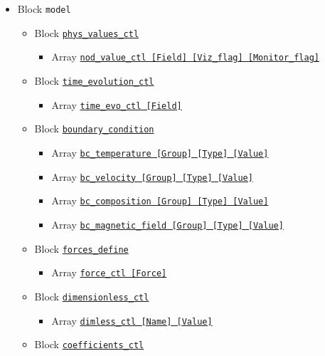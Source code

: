 \begin{itemize}
%
\item Block \verb|model|
	\begin{itemize}
	\item Block \hyperref[href_t:phys_values_ctl]{\tt phys\_values\_ctl}
		\begin{itemize} \label{href_i:phys_values_ctl}
		\item Array \hyperref[href_t:nod_value_ctl]
			{\tt nod\_value\_ctl    [Field]  [Viz\_flag]  [Monitor\_flag]}
		\end{itemize}
%
	\item Block \hyperref[href_t:time_evolution_ctl]{\tt time\_evolution\_ctl}
		\begin{itemize} \label{href_i:time_evolution_ctl}
		\item Array \hyperref[href_t:time_evo_ctl]
			{\tt time\_evo\_ctl    [Field]}
		\end{itemize}
%
	\item Block \hyperref[href_t:boundary_condition]{\tt boundary\_condition}
		\begin{itemize} \label{href_i:boundary_condition}
		\item Array \hyperref[href_t:bc_temperature]
            {\tt bc\_temperature       [Group]  [Type]  [Value]}
		\item Array \hyperref[href_t:bc_velocity]
			{\tt bc\_velocity          [Group]  [Type]  [Value]}
		\item Array \hyperref[href_t:bc_composition]
			{\tt bc\_composition       [Group]  [Type]  [Value]}
		\item Array \hyperref[href_t:bc_magnetic_field]
			{\tt bc\_magnetic\_field    [Group]  [Type]  [Value]}
		\end{itemize}
%
	\item Block \hyperref[href_t:forces_define]{\tt forces\_define}
		\begin{itemize} \label{href_i:forces_define}
		\item Array \hyperref[href_t:force_ctl]{\tt force\_ctl    [Force]}
		\end{itemize}
%
	\item Block \hyperref[href_t:dimensionless_ctl]{\tt dimensionless\_ctl}
		\begin{itemize} \label{href_i:dimensionless_ctl}
		\item Array \hyperref[href_t:dimless_ctl]{\tt dimless\_ctl    [Name]  [Value]}
		\end{itemize}
%
	\item Block \hyperref[href_t:coefficients_ctl]{\tt coefficients\_ctl}

\end{itemize}
\end{itemize}
